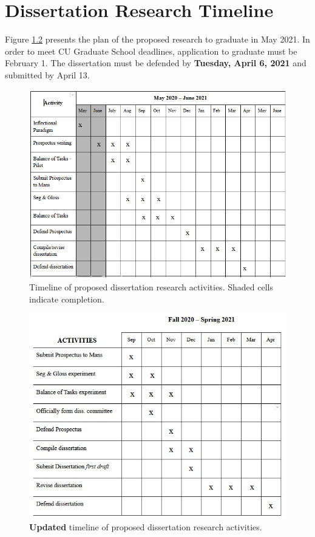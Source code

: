 \chapter{Dissertation Research Timeline}
\label{chap:timeline}

Figure \ref{fig:timeline} presents the plan of the proposed research to graduate in May 2021. In order to meet CU Graduate School deadlines, application to graduate must be February 1. The dissertation must be defended by \textbf{Tuesday, April 6, 2021} and submitted by April 13.

\begin{figure}[H]
    \centering
    \includegraphics[width=15cm]{figs/Timeline.png}
    \caption[Timeline]{Timeline of proposed dissertation research activities. Shaded cells indicate completion.}
    \label{fig:timeline}
\end{figure}

\begin{figure}[H]
    \centering
    \includegraphics[width=15cm]{figs/TimelineUpdated.jpg}
    \caption[Timeline]{\textbf{Updated} timeline of proposed dissertation research activities.}
    \label{fig:timeline}
\end{figure}